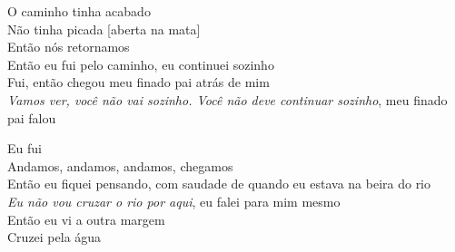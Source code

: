 \bigskip

\begin{linenumbers}\begingroup\raggedright
 
\noindent   O caminho tinha acabado\\
  Não tinha picada {[}aberta na mata{]}\\
  Então nós retornamos\\
  Então eu fui pelo caminho, eu continuei sozinho\\
  Fui, então chegou meu finado pai atrás de mim\\
  \emph{Vamos ver, você não vai sozinho. Você não deve continuar sozinho},
 meu finado pai falou
 
\end{linenumbers}\endgroup

\bigskip

\begin{linenumbers}\begingroup\raggedright
 
\noindent   Eu fui\\
  Andamos, andamos, andamos, chegamos\\
  Então eu fiquei pensando, com saudade de quando eu estava na beira do rio\\
  \emph{Eu não vou cruzar o rio por aqui}, eu falei para mim mesmo\\
  Então eu vi a outra margem\\
  Cruzei pela água
 
\end{linenumbers}\endgroup

\bigskip

